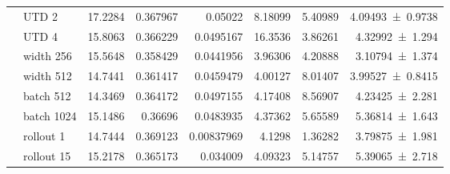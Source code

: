 {\begin{longtable}{@{}llrrrrrr@{}}
     & UTD 2 & \num{17.2284} & \num{0.367967} & \num{0.05022} & \num{8.18099} & \num{5.40989} & \num{4.09493+-0.9738} \\
     & UTD 4 & \num{15.8063} & \num{0.366229} & \num{0.0495167} & \num{16.3536} & \num{3.86261} & \num{4.32992+-1.294} \\
     & width 256 & \num{15.5648} & \num{0.358429} & \num{0.0441956} & \num{3.96306} & \num{4.20888} & \num{3.10794+-1.374} \\
     & width 512 & \num{14.7441} & \num{0.361417} & \num{0.0459479} & \num{4.00127} & \num{8.01407} & \num{3.99527+-0.8415} \\
     & batch 512 & \num{14.3469} & \num{0.364172} & \num{0.0497155} & \num{4.17408} & \num{8.56907} & \num{4.23425+-2.281} \\
     & batch 1024 & \num{15.1486} & \num{0.36696} & \num{0.0483935} & \num{4.37362} & \num{5.65589} & \num{5.36814+-1.643} \\
     & rollout 1 & \num{14.7444} & \num{0.369123} & \num{0.00837969} & \num{4.1298} & \num{1.36282} & \num{3.79875+-1.981} \\
     & rollout 15 & \num{15.2178} & \num{0.365173} & \num{0.034009} & \num{4.09323} & \num{5.14757} & \num{5.39065+-2.718} \\
  \end{longtable}
}

